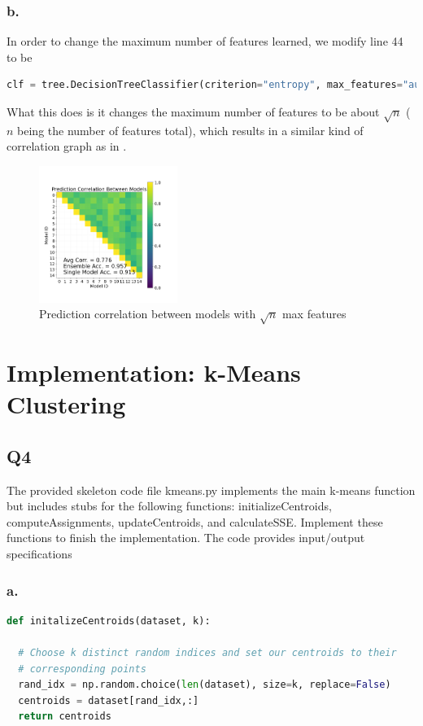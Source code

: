 \documentclass{article}
\theoremstyle{definition}
\begin{document}
        \subsubsection*{b.}
            In order to change the maximum number of features learned, we 
            modify line 44 to be 
            \begin{lstlisting}[language=python]
clf = tree.DecisionTreeClassifier(criterion="entropy", max_features="auto")
            \end{lstlisting}
            What this does is it changes the maximum number of features to 
            be about $\sqrt{n}$ ($n$ being the number of features total),
            which results in a similar kind of correlation graph as in 
            .
            \begin{figure}[htpb]
                \centering
                \includegraphics[width=0.4\textwidth]{figures/q3_b.png}
                \caption{Prediction correlation between models with 
                    $\sqrt n$ max features}
                \label{fig:}
            \end{figure}
\section{Implementation: k-Means Clustering}
    \subsection*{Q4}
       \begin{mdframed}
           The provided skeleton code file kmeans.py implements the main 
           k-means function but includes stubs for the following functions: 
           initializeCentroids, computeAssignments, updateCentroids, and 
           calculateSSE. Implement these functions to finish the 
           implementation. The code provides input/output specifications
       \end{mdframed} 
       \subsubsection*{a.}
       \begin{lstlisting}[language=python]
def initalizeCentroids(dataset, k):

  # Choose k distinct random indices and set our centroids to their
  # corresponding points
  rand_idx = np.random.choice(len(dataset), size=k, replace=False)
  centroids = dataset[rand_idx,:]
  return centroids
       \end{lstlisting}
\end{document}
